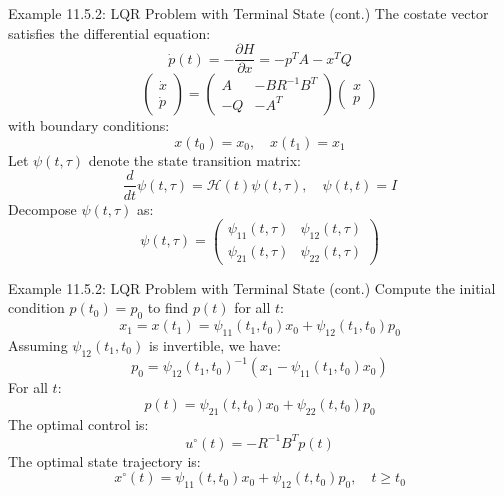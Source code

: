 \documentclass[10pt]{beamer}
\begin{document}
\begin{frame}[fragile]{Example 11.5.2: LQR Problem with Terminal State (cont.)}
  The costate vector satisfies the differential equation:
  \[
  \dot{p}(t) = -\frac{\partial H}{\partial x} = -p^T A - x^T Q
  \]
  \[
    \begin{pmatrix}
      \dot{x} \\
      \dot{p}
      \end{pmatrix} = \begin{pmatrix}
  A & -BR^{-1}B^T \\
  -Q & -A^T
  \end{pmatrix} \begin{pmatrix}
  x \\
  p
  \end{pmatrix}
  \]
  with boundary conditions:
  \[
  x(t_0) = x_0, \quad x(t_1) = x_1
  \]
  Let \( \psi(t, \tau) \) denote the state transition matrix:
  \[
  \frac{d}{dt} \psi(t, \tau) = \mathcal{H}(t) \psi(t, \tau), \quad \psi(t, t) = I
  \]
  Decompose \( \psi(t, \tau) \) as:
  \[
  \psi(t, \tau) = \begin{pmatrix}
  \psi_{11}(t, \tau) & \psi_{12}(t, \tau) \\
  \psi_{21}(t, \tau) & \psi_{22}(t, \tau)
  \end{pmatrix}
  \]
\end{frame}
  
\begin{frame}[fragile]{Example 11.5.2: LQR Problem with Terminal State (cont.)}
  Compute the initial condition \( p(t_0) = p_0 \) to find \( p(t) \) for all \( t \):
  \[
  x_1 = x(t_1) = \psi_{11}(t_1, t_0) x_0 + \psi_{12}(t_1, t_0) p_0
  \]
  Assuming \( \psi_{12}(t_1, t_0) \) is invertible, we have:
  \[
  p_0 = \psi_{12}(t_1, t_0)^{-1} (x_1 - \psi_{11}(t_1, t_0) x_0)
  \]
  For all \( t \):
  \[
  p(t) = \psi_{21}(t, t_0) x_0 + \psi_{22}(t, t_0) p_0
  \]
  The optimal control is:
  \[
  u^\circ(t) = -R^{-1} B^T p(t)
  \]
  The optimal state trajectory is:
  \[
  x^\circ(t) = \psi_{11}(t, t_0) x_0 + \psi_{12}(t, t_0) p_0, \quad t \ge t_0
  \]
\end{frame}
  
\end{document}
